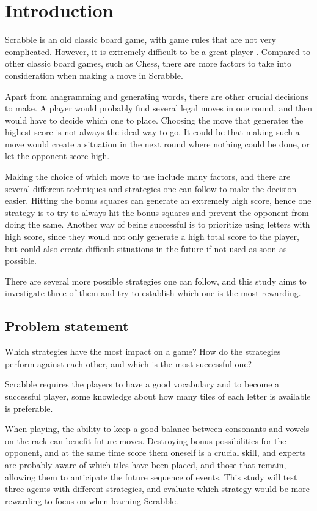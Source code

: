 \documentclass[a4paper, 12pt]{report}
\begin{document}
\chapter{Introduction}
Scrabble is an old classic board game, with game rules that are not very complicated. However, it is extremely difficult to be a great player \cite{perfectgame}. Compared to other classic board games, such as Chess, there are more factors to take into consideration when making a move in Scrabble. 

Apart from anagramming and generating words, there are other crucial decisions to make. A player would probably find several legal moves in one round, and then would have to decide which one to place. Choosing the move that generates the highest score is not always the ideal way to go. It could be that making such a move would create a situation in the next round where nothing could be done, or let the opponent score high.

Making the choice of which move to use include many factors, and there are several different techniques and strategies one can follow to make the decision easier. Hitting the bonus squares can generate an extremely high score, hence one strategy is to try to always hit the bonus squares and prevent the opponent from doing the same. Another way of being successful is to prioritize using letters with high score, since they would not only generate a high total score to the player, but could also create difficult situations in the future if not used as soon as possible.

There are several more possible strategies one can follow, and this study aims to investigate three of them and try to establish which one is the most rewarding.

\section{Problem statement}
Which strategies have the most impact on a game? How do the strategies perform against each other, and which is the most successful one?

Scrabble requires the players to have a good vocabulary and to become a successful player, some knowledge about how many tiles of each letter is available is preferable. 

When playing, the ability to keep a good balance between consonants and vowels on the rack can benefit future moves. Destroying bonus possibilities for the opponent, and at the same time score them oneself is a crucial skill, and experts are probably aware of which tiles have been placed, and those that remain, allowing them to anticipate the future sequence of events. This study will test three agents with different strategies, and evaluate which strategy would be more rewarding to focus on when learning Scrabble.
\end{document}
